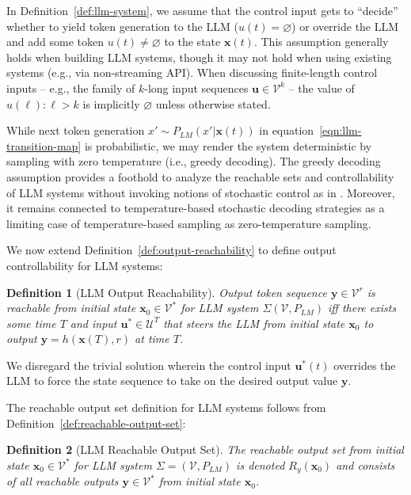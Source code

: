 \documentclass{article} %
\newtheorem{definition}{Definition}
\begin{document}
In Definition~\ref{def:llm-system}, we assume that the control input gets to ``decide'' whether to yield token generation to the LLM ($u(t) = \varnothing$) or override the LLM and add some token $u(t) \neq \varnothing$ to the state $\mathbf x(t)$. 
This assumption generally holds when building LLM systems, though it may not hold when using existing systems (e.g., via non-streaming API). 
When discussing finite-length control inputs -- e.g., the family of $k$-long input sequences $\mathbf u \in \mathcal V^k$ -- the value of $u(\ell) : \ell > k$ is implicitly $\varnothing$ unless otherwise stated.  

While next token generation $x' \sim P_{LM} (x' | \mathbf x(t))$ in equation~\ref{eqn:llm-transition-map} is probabilistic, we may render the system deterministic by sampling with zero temperature (i.e., greedy decoding). The greedy decoding assumption provides a foothold to analyze the reachable sets and controllability of LLM systems without invoking notions of stochastic control as in \cite{sivaramakrishnan2023stochastic, soatto2023taming}. 
Moreover, it remains connected to temperature-based stochastic decoding strategies as a limiting case of temperature-based sampling as zero-temperature sampling. 



We now extend Definition~\ref{def:output-reachability} to define output controllability for LLM systems: 

\begin{definition}[LLM Output Reachability]
\label{def:llm-output-reachability}
Output token sequence $\mathbf y \in \mathcal V^r$ is reachable from initial state $\mathbf x_0\in \mathcal V^*$ for LLM system $\Sigma(\mathcal V, P_{LM})$ iff there exists some time $T$ and input $\mathbf u^* \in \mathcal U^T$ that steers the LLM from initial state $\mathbf x_0$ to output $\mathbf y = h(\mathbf x(T), r)$ at time $T$.
\end{definition}

We disregard the trivial solution wherein the control input $\mathbf u^*(t)$ overrides the LLM to force the state sequence to take on the desired output value $\mathbf y$. %

The reachable output set definition for LLM systems follows from Definition~\ref{def:reachable-output-set}: 

\begin{definition}[LLM Reachable Output Set]
\label{def:llm-reachable-output-set}
The reachable output set from initial state $\mathbf x_0\in \mathcal V^*$ for LLM system $\Sigma = (\mathcal V, P_{LM})$ is denoted $R_y(\mathbf x_0)$ and consists of all reachable outputs $\mathbf y \in \mathcal V^*$ from initial state $\mathbf x_0$. 
\end{definition}
\end{document}
